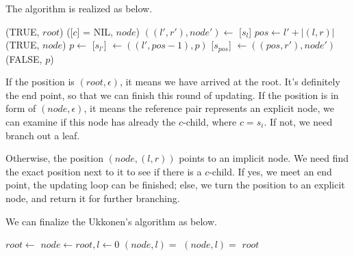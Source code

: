 \documentclass[UTF8]{article}
\begin{document}
The  algorithm is realized as below.

\begin{algorithmic}
      \State \Return (TRUE, $root$)
    \Else
      \State \Return ([$c$] = NIL, $node$)
    \EndIf
  \Else
    \State $((l', r'), node') \gets$ [$s_l$]
    \State $pos \gets l' + |(l, r)|$
      \State \Return (TRUE, $node$)
    \Else
      \State $p \gets$ 
      \State {}[$s_{l'}$] $\gets ((l', pos-1), p)$
      \State {}[$s_{pos}$] $\gets ((pos, r'), node')$
      \State \Return (FALSE, $p$)
    \EndIf
  \EndIf
\EndFunction
\end{algorithmic}

If the position is $(root, \epsilon)$, it means we have arrived at the root.
It's definitely the end point, so that we can finish this round of updating.
If the position is in form of $(node, \epsilon)$, it means the reference pair represents
an explicit node, we can examine if this node has already the $c$-child, where $c=s_i$.
If not, we need branch out a leaf.

Otherwise, the position $(node, (l, r))$ points to an implicit node.
We need find the exact position next to it to see if there is a $c$-child.
If yes, we meet an end point, the updating loop can be finished; else, we turn
the position to an explicit node, and return it for further branching.

We can finalize the Ukkonen's algorithm as below.

\begin{algorithmic}[1]
  \State $root \gets$ 
  \State $node \gets root, l \gets 0$
    \State $(node, l) = $ 
    \State $(node, l) = $ 
  \EndFor
  \State \Return $root$
\EndFunction
\end{algorithmic}
\end{document}
